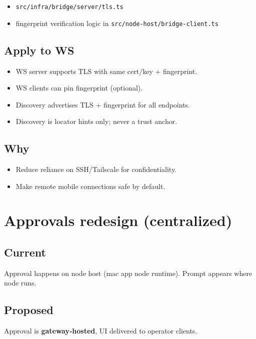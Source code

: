\begin{itemize}
  \item \texttt{src/infra/bridge/server/tls.ts}
  \item fingerprint verification logic in \texttt{src/node-host/bridge-client.ts}
\end{itemize}


\subsection{Apply to WS}


\begin{itemize}
  \item WS server supports TLS with same cert/key + fingerprint.
  \item WS clients can pin fingerprint (optional).
  \item Discovery advertises TLS + fingerprint for all endpoints.
  \item Discovery is locator hints only; never a trust anchor.
\end{itemize}


\subsection{Why}


\begin{itemize}
  \item Reduce reliance on SSH/Tailscale for confidentiality.
  \item Make remote mobile connections safe by default.
\end{itemize}


\hrulefill


\section{Approvals redesign (centralized)}


\subsection{Current}


Approval happens on node host (mac app node runtime). Prompt appears where node runs.

\subsection{Proposed}


Approval is \textbf{gateway‑hosted}, UI delivered to operator clients.

